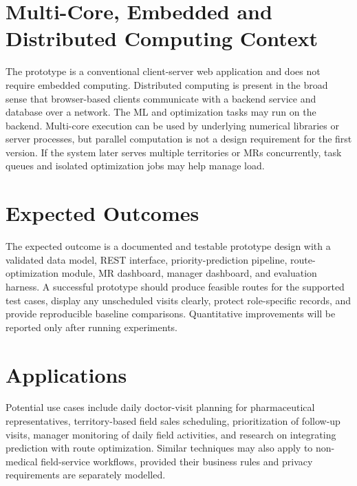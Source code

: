 \documentclass[12pt,a4paper,oneside]{report}
\begin{document}
\section{Multi-Core, Embedded and Distributed Computing Context}
The prototype is a conventional client-server web application and does not require embedded computing. Distributed computing is present in the broad sense that browser-based clients communicate with a backend service and database over a network. The ML and optimization tasks may run on the backend. Multi-core execution can be used by underlying numerical libraries or server processes, but parallel computation is not a design requirement for the first version. If the system later serves multiple territories or MRs concurrently, task queues and isolated optimization jobs may help manage load.

\section{Expected Outcomes}
The expected outcome is a documented and testable prototype design with a validated data model, REST interface, priority-prediction pipeline, route-optimization module, MR dashboard, manager dashboard, and evaluation harness. A successful prototype should produce feasible routes for the supported test cases, display any unscheduled visits clearly, protect role-specific records, and provide reproducible baseline comparisons. Quantitative improvements will be reported only after running experiments.

\section{Applications}
Potential use cases include daily doctor-visit planning for pharmaceutical representatives, territory-based field sales scheduling, prioritization of follow-up visits, manager monitoring of daily field activities, and research on integrating prediction with route optimization. Similar techniques may also apply to non-medical field-service workflows, provided their business rules and privacy requirements are separately modelled.
\end{document}
